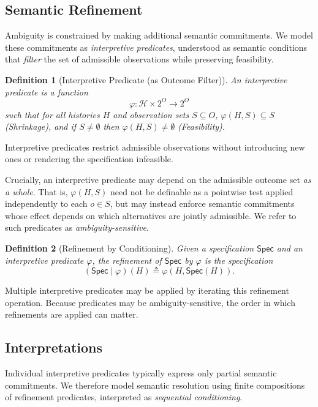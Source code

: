 \documentclass[acmsmall,nonacm]{acmart}
\newtheorem{definition}{Definition}
\theoremstyle{remark}
\numberwithin{definition}{section}
\numberwithin{theorem}{section}
\numberwithin{lemma}{section}
\numberwithin{corollary}{section}
\numberwithin{remark}{section}
\numberwithin{example}{section}
\numberwithin{observation}{section}
\numberwithin{assumption}{section}
\newcommand{\Hist}{\mathcal{H}}
\newcommand{\Spec}{\mathsf{Spec}}
\begin{document}
\subsection{Semantic Refinement}

Ambiguity is constrained by making additional semantic commitments.
We model these commitments as \emph{interpretive predicates}, understood as
semantic conditions that \emph{filter} the set of admissible observations while
preserving feasibility.

\begin{definition}[Interpretive Predicate (as Outcome Filter)]
An \emph{interpretive predicate} is a function
\[
  \varphi : \Hist \times 2^{O} \to 2^{O}
\]
such that for all histories $H$ and observation sets $S \subseteq O$, \hspace{0.8mm} $\varphi(H,S)
\subseteq S$ (\emph{Shrinkage}), and if $S \neq \emptyset$ then $\varphi(H,S) \neq \emptyset$
 (\emph{Feasibility}).
\end{definition}
Interpretive predicates restrict admissible observations without introducing new ones or rendering
the specification infeasible.

Crucially, an interpretive predicate may depend on the admissible outcome set
\emph{as a whole}.
That is, $\varphi(H,S)$ need not be definable as a pointwise test applied
independently to each $o \in S$, but may instead enforce semantic commitments
whose effect depends on which alternatives are jointly admissible.
We refer to such predicates as \emph{ambiguity-sensitive}.

\begin{definition}[Refinement by Conditioning]
Given a specification $\Spec$ and an interpretive predicate $\varphi$, the
\emph{refinement} of $\Spec$ by $\varphi$ is the specification
\[
  (\Spec \mid \varphi)(H) \triangleq \varphi(H,\Spec(H)).
\]
\end{definition}

Multiple interpretive predicates may be applied by iterating this refinement
operation.
Because predicates may be ambiguity-sensitive, the order in which refinements
are applied can matter.

\subsection{Interpretations}

Individual interpretive predicates typically express only partial semantic
commitments.
We therefore model semantic resolution using finite compositions of refinement
predicates, interpreted as \emph{sequential conditioning}.
\end{document}
